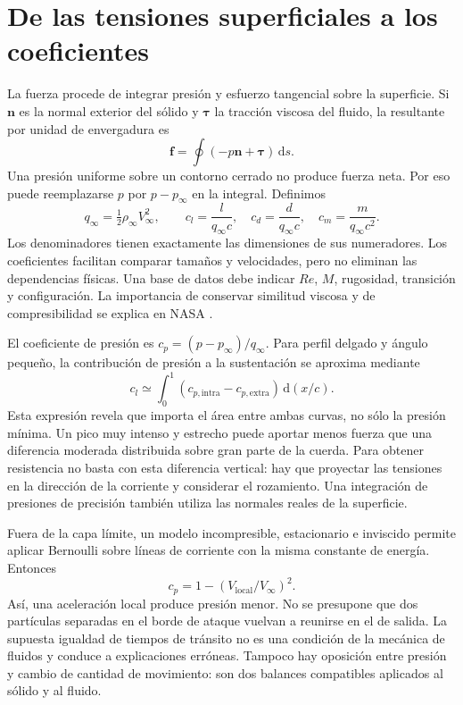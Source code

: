 \section{De las tensiones superficiales a los coeficientes}
La fuerza procede de integrar presión y esfuerzo tangencial sobre la superficie. Si $\boldsymbol n$ es la normal exterior del sólido y $\boldsymbol\tau$ la tracción viscosa del fluido, la resultante por unidad de envergadura es
\begin{equation}
\boldsymbol f=\oint(-p\boldsymbol n+\boldsymbol\tau)\,\mathrm ds.
\end{equation}
Una presión uniforme sobre un contorno cerrado no produce fuerza neta. Por eso puede reemplazarse $p$ por $p-p_\infty$ en la integral. Definimos
\begin{equation}
q_\infty=\tfrac12\rho_\infty V_\infty^2,\qquad
c_l=\frac{l}{q_\infty c},\quad c_d=\frac{d}{q_\infty c},\quad
c_m=\frac{m}{q_\infty c^2}.
\end{equation}
Los denominadores tienen exactamente las dimensiones de sus numeradores. Los coeficientes facilitan comparar tamaños y velocidades, pero no eliminan las dependencias físicas. Una base de datos debe indicar $Re$, $M$, rugosidad, transición y configuración. La importancia de conservar similitud viscosa y de compresibilidad se explica en NASA \cite{NASA-BGA}.

El coeficiente de presión es $c_p=(p-p_\infty)/q_\infty$. Para perfil delgado y ángulo pequeño, la contribución de presión a la sustentación se aproxima mediante
\begin{equation}
c_l\simeq\int_0^1(c_{p,\mathrm{intra}}-c_{p,\mathrm{extra}})\,\mathrm d(x/c).
\end{equation}
Esta expresión revela que importa el área entre ambas curvas, no sólo la presión mínima. Un pico muy intenso y estrecho puede aportar menos fuerza que una diferencia moderada distribuida sobre gran parte de la cuerda. Para obtener resistencia no basta con esta diferencia vertical: hay que proyectar las tensiones en la dirección de la corriente y considerar el rozamiento. Una integración de presiones de precisión también utiliza las normales reales de la superficie.

Fuera de la capa límite, un modelo incompresible, estacionario e inviscido permite aplicar Bernoulli sobre líneas de corriente con la misma constante de energía. Entonces
\begin{equation}
c_p=1-(V_{\mathrm{local}}/V_\infty)^2.
\end{equation}
Así, una aceleración local produce presión menor. No se presupone que dos partículas separadas en el borde de ataque vuelvan a reunirse en el de salida. La supuesta igualdad de tiempos de tránsito no es una condición de la mecánica de fluidos y conduce a explicaciones erróneas. Tampoco hay oposición entre presión y cambio de cantidad de movimiento: son dos balances compatibles aplicados al sólido y al fluido.

